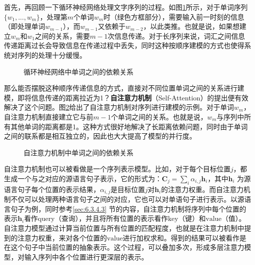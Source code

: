 \parinterval 首先，再回顾一下循环神经网络处理文字序列的过程。如图\ref{fig:6-36}所示，对于单词序列$\{ w_1,...,w_m \}$，处理第$m$个单词$w_m$时（绿色方框部分），需要输入前一时刻的信息（即处理单词$w_{m-1}$），而$w_{m-1}$又依赖于$w_{m-2}$，以此类推。也就是说，如果想建立$w_m$和$w_1$之间的关系，需要$m-1$次信息传递。对于长序列来说，词汇之间信息传递距离过长会导致信息在传递过程中丢失，同时这种按顺序建模的方式也使得系统对序列的处理十分缓慢。

\begin{figure}[htp]
\centering

\caption{循环神经网络中单词之间的依赖关系}
\label{fig:6-36}
\end{figure}

\parinterval 那么能否摆脱这种顺序传递信息的方式，直接对不同位置单词之间的关系进行建模，即将信息传递的距离拉近为1？{\small\sffamily\bfseries{自注意力机制}}（Self-Attention）的提出便有效解决了这个问题\cite{DBLP:journals/corr/LinFSYXZB17}。图\ref{fig:6-37}给出了自注意力机制对序列进行建模的示例。对于单词$w_m$，自注意力机制直接建立它与前$m-1$个单词之间的关系。也就是说，$w_m$与序列中所有其他单词的距离都是1。这种方式很好地解决了长距离依赖问题，同时由于单词之间的联系都是相互独立的，因此也大大提高了模型的并行度。

\begin{figure}[htp]
\centering

\caption{自注意力机制中单词之间的依赖关系}
\label{fig:6-37}
\end{figure}

\parinterval 自注意力机制也可以被看做是一个序列表示模型。比如，对于每个目标位置$j$，都生成一个与之对应的源语言句子表示，它的形式为：$\mathbf{C}_j = \sum_i \alpha_{i,j}\mathbf{h}_i$，其中$\mathbf{h}_i$ 为源语言句子每个位置的表示结果，$\alpha_{i,j}$是目标位置$j$对$\mathbf{h}_i$的注意力权重。而自注意力机制不仅可以处理两种语言句子之间的对应，它也可以对单语句子进行表示。以源语言句子为例，同时参考\ref{sec:6.3.4.3} 节的内容，自注意力机制将序列中每个位置的表示$\mathbf{h}_i$看作$\mathrm{query}$（查询），并且将所有位置的表示看作$\mathrm{key}$（键）和$\mathrm{value}$（值）。自注意力模型通过计算当前位置与所有位置的匹配程度，也就是在注意力机制中提到的注意力权重，来对各个位置的$\mathrm{value}$进行加权求和。得到的结果可以被看作是在这个句子中当前位置的抽象表示。这个过程，可以叠加多次，形成多层注意力模型，对输入序列中各个位置进行更深层的表示。

